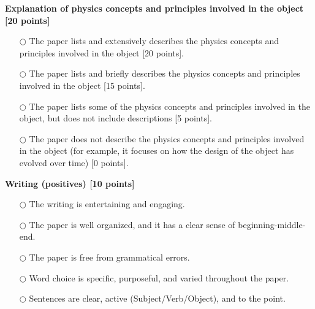 \documentclass[12pt]{article}   %
\begin{document}
{\textbf{Explanation of physics concepts and principles involved in the object [20 points]}}
\begin{itemize}
\item[$\bigcirc$] The paper lists and extensively describes the physics concepts and principles involved in the object [20 points].
\item[$\bigcirc$] The paper lists and briefly describes the physics concepts and principles involved in the object [15 points]. 
\item[$\bigcirc$] The paper lists  some of the physics concepts and principles involved in the object, but does not include descriptions [5 points].
\item[$\bigcirc$] The paper does not describe the physics concepts and principles involved in the object (for example, it focuses on how the design of the object has evolved over time) [0 points].

\end{itemize}
\smallskip

{\textbf{Writing (positives) [10 points]}}
\begin{itemize}
\item[$\bigcirc$] The writing is entertaining and engaging.

\item[$\bigcirc$] The paper is well organized, and it has a clear sense of beginning-middle-end.
\item[$\bigcirc$] The paper is free from grammatical errors.
\item[$\bigcirc$] Word choice is specific, purposeful, and varied throughout the paper.
\item[$\bigcirc$] Sentences are clear, active (Subject/Verb/Object), and to the point. 

\end{itemize}
\end{document}
